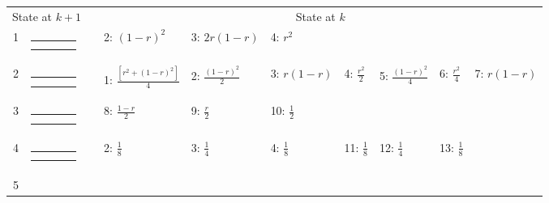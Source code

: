 \begin{center}
\begin{tabular}{ccclllllll} \hline
\multicolumn{2}{c}{State at $k+1$} & &
\multicolumn{7}{c}{State at $k$} \\
\cline{1-2} \cline{4-10}
1 &
{\renewcommand{\arraystretch}{0.3}
\renewcommand{\tabcolsep}{0.5mm}
\parbox[b][3mm][c]{12mm}{
\begin{tabular}{|p{2mm}|p{2mm}||p{2mm}|p{2mm}|} \hline
$\bullet$ & $\bullet$ &           &           \\
$\bullet$ & $\bullet$ &           &           \\ \hline
\end{tabular}}}
&
& 2: $(1-r)^2$
& 3: $2r(1-r)$
& 4: $r^2$
& & & & \\
2 &
{\renewcommand{\arraystretch}{0.3}
\renewcommand{\tabcolsep}{0.5mm}
\parbox[b][3mm][c]{12mm}{
\begin{tabular}{|p{2mm}|p{2mm}||p{2mm}|p{2mm}|} \hline
$\bullet$ &           & $\bullet$ &           \\
$\bullet$ &           & $\bullet$ &           \\ \hline
\end{tabular}}}
&
& 1: $\frac{[r^2+(1-r)^2]}{4}$
& 2: $\frac{(1-r)^2}{2}$
& 3: $r(1-r)$
& 4: $\frac{r^2}{2}$
& 5: $\frac{(1-r)^2}{4}$
& 6: $\frac{r^2}{4}$
& 7: $r(1-r)$
\\
3 &
{\renewcommand{\arraystretch}{0.3}
\renewcommand{\tabcolsep}{0.5mm}
\parbox[b][3mm][c]{12mm}{
\begin{tabular}{|p{2mm}|p{2mm}||p{2mm}|p{2mm}|} \hline
$\bullet$ &           & $\bullet$ &           \\
$\bullet$ &           &           & $\bullet$ \\ \hline
\end{tabular}}}
&
& 8: $\frac{1-r}{2}$
& 9: $\frac{r}{2}$
& 10: $\frac{1}{2}$
& & & & \\
4 &
{\renewcommand{\arraystretch}{0.3}
\renewcommand{\tabcolsep}{0.5mm}
\parbox[b][3mm][c]{12mm}{
\begin{tabular}{|p{2mm}|p{2mm}||p{2mm}|p{2mm}|} \hline
$\bullet$ &           & $\bullet$ &           \\
          & $\bullet$ &           & $\bullet$ \\ \hline
\end{tabular}}}
&
& 2: $\frac{1}{8}$
& 3: $\frac{1}{4}$
& 4: $\frac{1}{8}$
& 11: $\frac{1}{8}$
& 12: $\frac{1}{4}$
& 13: $\frac{1}{8}$
& \\
5 &
{\renewcommand{\arraystretch}{0.3}
}
\end{tabular}
\end{center}

